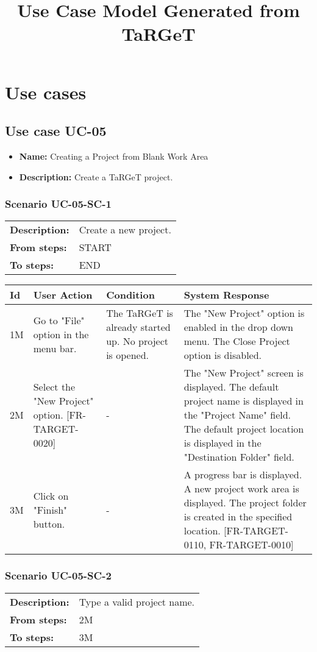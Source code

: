 \documentclass[a4paper,11pt]{article}
\title{Use Case Model Generated from TaRGeT}
\newcommand{\bl}{\\ \hline}
\begin{document}
\maketitle
\section*{Use cases}
\subsection*{Use case UC-05}
\begin{itemize}
\item {\bf Name: }Creating a Project from Blank Work Area
\item {\bf Description: }Create a TaRGeT project.
\end{itemize}
\subsubsection*{Scenario UC-05-SC-1}
\begin{tabular}{p{1in}p{4in}}
{\bf Description:} & Create a new project. \\
{\bf From steps:} & START \\
{\bf To steps:} & END \\
\end{tabular}
 
\begin{tabular}{|p{0.8in}|p{1.6in}|p{1.6in}|p{1.6in}|}
\hline
Id & User Action & Condition & System Response  \bl 
1M & Go to "File" option in the menu bar. & The TaRGeT is already started up. No project is opened. & The "New Project" option is enabled in the drop down menu. The Close Project option is disabled. \bl 
2M & Select the "New Project" option. [FR-TARGET-0020] & - & The "New Project" screen is displayed. The default project name is displayed in the "Project Name" field. The default project location is displayed in the "Destination Folder" field. \bl 
3M & Click on "Finish" button. & - & A progress bar is displayed. A new project work area is displayed. The project folder is created in the specified location. [FR-TARGET-0110, FR-TARGET-0010] \bl 
\end{tabular}
\subsubsection*{Scenario UC-05-SC-2}
\begin{tabular}{p{1in}p{4in}}
{\bf Description:} & Type a valid project name. \\
{\bf From steps:} & 2M \\
{\bf To steps:} & 3M \\
\end{tabular}
 
\end{document}
